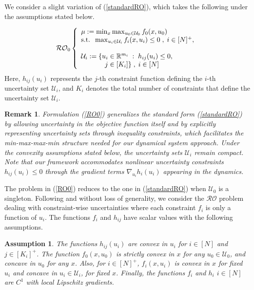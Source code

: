 \documentclass[journal,twoside,web]{ieeecolor}
\newcommand{\rev}[1]{\textcolor{revisionblue}{#1}}
\newtheorem{assumption}[theorem]{Assumption}
\newtheorem{remark}{Remark}
\begin{document}
We consider a slight variation of (\ref{standardRO}), which takes the following under the assumptions stated below.

\begin{equation}\label{RO0}
\mathcal{RO}_0\left\{ \begin{array}{l}
\mu:=\min_{x} \max_{u_0\in \mathcal{U}_0} f_0(x,u_0)\\
\text{s.t.}\;\;\max_{u_i\in \mathcal{U}_i} f_i(x,u_i)\leq 0\;,\;i\in[N]^+,\\ \\
\mathcal{U}_i:=\{u_i\in \mathbb{R}^{m_i}\;:\;h_{ij}(u_i)\leq 0,\\
\hspace{3.5em} j\in[K_i]\}\;,\;i\in[N]
\end{array}\right.
\end{equation}
\rev{Here, $h_{ij}(u_i)$ represents the $j$-th constraint function defining the $i$-th uncertainty set $\mathcal{U}_i$, and $K_i$ denotes the total number of constraints that define the uncertainty set $\mathcal{U}_i$.} 

\begin{remark} \rev{Formulation (\ref{RO0}) generalizes the standard form (\ref{standardRO}) by allowing uncertainty in the objective function itself and by explicitly representing uncertainty sets through inequality constraints, which facilitates the min-max-max-min structure needed for our dynamical system approach. Under the convexity assumptions stated below, the uncertainty sets $\mathcal{U}_i$ remain compact. Note that our framework accommodates nonlinear uncertainty constraints $h_{ij}(u_i) \leq 0$ through the gradient terms $\nabla_{u_i} h_i(u_i)$ appearing in the dynamics.}
\end{remark}

The problem in (\ref{RO0}) reduces to the one in (\ref{standardRO}) when $\mathcal{U}_0$ is a singleton.
Following \cite{bental2009-2} and without loss of generality, we consider the $\mathcal{RO}$ problem dealing with constraint-wise uncertainties where each constraint $f_i$ is only a function of $u_i$.
The functions $f_i$ and $h_{ij}$ have scalar values with the following assumptions.

\begin{assumption}\label{assume1} The functions $h_{ij}(u_i)$ are convex in $u_i$ for $i\in[N]$ and $j\in[K_i]^+$.
The function $f_0(x,u_0)$ is strictly convex in $x$ for any $u_0\in \mathcal{U}_0$, and concave in $u_0$ for any $x$. Also, for $i\in[N]^+$, $f_i(x,u_i)$ is convex in $x$ for fixed $u_i$ and concave in $u_i\in \mathcal{U}_i$, for fixed $x$.
Finally, the functions $f_i$ and $h_i$ $i\in[N]$ are $C^1$ with local Lipschitz gradients.
\end{assumption}
\end{document}
